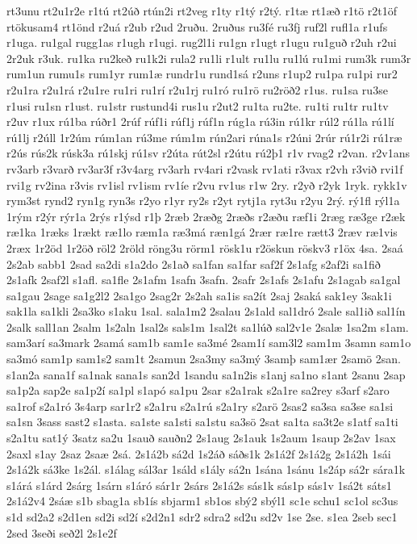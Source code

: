 {rt3unu
rt2u1r2e
r1tú
rt2úð
rtún2i
rt2veg
r1ty
r1tý
r2tý.
r1tæ
rt1æð
r1tö
r2t1öf
rtökusam4
rt1önd
r2uá
r2ub
r2ud
2ruðu.
2ruðus
ru3fé
ru3fj
ruf2l
rufl1a
r1ufs
r1uga.
ru1gal
rugg1as
r1ugh
r1ugi.
rug2l1i
ru1gn
r1ugt
r1ugu
ru1guð
r2uh
r2ui
2r2uk
r3uk.
ru1ka
ru2keð
ru1k2i
rula2
ru1li
r1ult
ru1lu
ru1lú
ru1mi
rum3k
rum3r
rum1un
rumu1s
rum1yr
rum1æ
rundr1u
rund1sá
r2uns
r1up2
ru1pa
ru1pi
rur2
r2u1ra
r2u1rá
r2u1re
ru1ri
ru1rí
r2u1rj
ru1ró
ru1rö
ru2röð2
r1us.
ru1sa
ru3se
r1usi
ru1sn
r1ust.
ru1str
rustund4i
rus1u
r2ut2
ru1ta
ru2te.
ru1ti
ru1tr
ru1tv
r2uv
r1ux
rú1ba
rúðr1
2rúf
rúf1i
rúf1j
rúf1n
rúg1a
rú3in
rú1kr
rúl2
rú1la
rú1lí
rú1lj
r2úll
1r2úm
rúm1an
rú3me
rúm1m
rún2ari
rúna1s
r2úni
2rúr
rú1r2i
rú1ræ
r2ús
rús2k
rúsk3a
rú1skj
rú1sv
r2úta
rút2sl
r2útu
rú2þ1
r1v
rvag2
r2van.
r2v1ans
rv3arb
r3varð
rv3ar3f
r3v4arg
rv3arh
rv4ari
r2vask
rv1ati
r3vax
r2vh
r3við
rvi1f
rvi1g
rv2ina
r3vis
rv1isl
rv1ism
rv1íe
r2vu
rv1us
r1w
2ry.
r2yð
r2yk
1ryk.
rykk1v
rym3st
rynd2
ryn1g
ryn3s
r2yo
r1yr
ry2s
r2yt
rytj1a
ryt3u
r2yu
2rý.
rý1fl
rýl1a
1rým
r2ýr
rýr1a
2rýs
r1ýsd
r1þ
2ræb
2ræðg
2ræðs
r2æðu
ræf1i
2ræg
ræ3ge
r2æk
ræ1ka
1ræks
1rækt
ræ1lo
ræm1a
ræ3má
ræn1gá
2rær
ræ1re
rætt3
2ræv
ræ1vis
2ræx
1r2öd
1r2öð
röl2
2röld
röng3u
rörm1
rösk1u
r2öskun
röskv3
r1öx
4sa.
2saá
2s2ab
sabb1
2sad
sa2di
s1a2do
2s1að
sa1fan
sa1far
saf2f
2s1afg
s2af2i
sa1fið
2s1afk
2saf2l
s1afl.
sa1fle
2s1afm
1safn
3safn.
2safr
2s1afs
2s1afu
2s1agab
sa1gal
sa1gau
2sage
sa1g2l2
2sa1go
2sag2r
2s2ah
sa1is
sa2ít
2saj
2saká
sak1ey
3sak1i
sak1la
sa1kli
2sa3ko
s1aku
1sal.
sala1m2
2salau
2s1ald
sal1dró
2sale
sal1ið
sal1ín
2salk
sall1an
2salm
1s2aln
1sal2s
sals1m
1sal2t
sa1lúð
sal2v1e
2salæ
1sa2m
s1am.
sam3arí
sa3mark
2samá
sam1b
sam1e
sa3mé
2sam1í
sam3l2
sam1m
3samn
sam1o
sa3mó
sam1p
sam1s2
sam1t
2samun
2sa3my
sa3mý
3samþ
sam1ær
2samö
2san.
s1an2a
sana1f
sa1nak
sana1s
san2d
1sandu
sa1n2is
s1anj
sa1no
s1ant
2sanu
2sap
sa1p2a
sap2e
sa1p2í
sa1pl
s1apó
sa1pu
2sar
s2a1rak
s2a1re
sa2rey
s3arf
s2aro
sa1rof
s2a1ró
3s4arp
sar1r2
s2a1ru
s2a1rú
s2a1ry
s2arö
2sas2
sa3sa
sa3se
sa1si
sa1sn
3sass
sast2
s1asta.
sa1ste
sa1sti
sa1stu
sa3sö
2sat
sa1ta
sa3t2e
s1atf
sa1ti
s2a1tu
sat1ý
3satz
sa2u
1sauð
sauðn2
2s1aug
2s1auk
1s2aum
1saup
2s2av
1sax
2saxl
s1ay
2saz
2saæ
2sá.
2s1á2b
sá2d
1s2áð
sáðs1k
2s1á2f
2s1á2g
2s1á2h
1sái
2s1á2k
sá3ke
1s2ál.
s1álag
sál3ar
1sáld
s1ály
sá2n
1sána
1sánu
1s2áp
sá2r
sára1k
s1árá
s1árd
2sárg
1sárn
s1áró
sár1r
2sárs
2s1á2s
sás1k
sás1p
sás1v
1sá2t
sáts1
2s1á2v4
2sáæ
s1b
sbag1a
sb1ís
sbjarm1
sb1os
sbý2
sbýl1
sc1e
schu1
sc1ol
sc3us
s1d
sd2a2
s2d1en
sd2i
sd2í
s2d2n1
sdr2
sdra2
sd2u
sd2v
1se
2se.
s1ea
2seb
sec1
2sed
3seði
seð2l
2s1e2f
}
